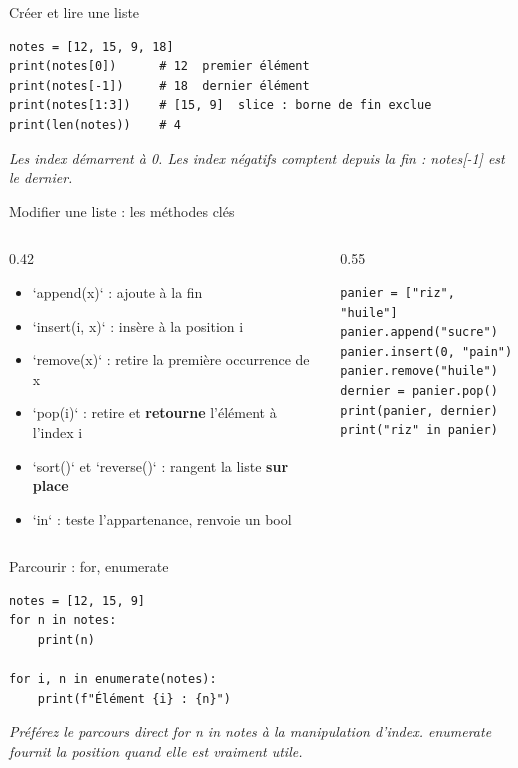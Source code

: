 \documentclass[aspectratio=169,11pt]{beamer}
\begin{document}
\begin{frame}[fragile]{Créer et lire une liste}

\begin{lstlisting}[style=py]
notes = [12, 15, 9, 18]
print(notes[0])      # 12  premier élément
print(notes[-1])     # 18  dernier élément
print(notes[1:3])    # [15, 9]  slice : borne de fin exclue
print(len(notes))    # 4
\end{lstlisting}
\vspace{0.5pt}

{\small\color{PyGris}\itshape Les index démarrent à 0. Les index négatifs comptent depuis la fin : notes[-1] est le dernier.}

\end{frame}

\begin{frame}[fragile]{Modifier une liste : les méthodes clés}
\begin{columns}[t]
\begin{column}{0.42\textwidth}
\begin{itemize}
  \setlength{\itemsep}{1.5pt}\setlength{\parskip}{0pt}
  \item `append(x)` : ajoute à la fin
  \item `insert(i, x)` : insère à la position i
  \item `remove(x)` : retire la première occurrence de x
  \item `pop(i)` : retire et \textbf{retourne} l'élément à l'index i
  \item `sort()` et `reverse()` : rangent la liste \textbf{sur place}
  \item `in` : teste l'appartenance, renvoie un bool
\end{itemize}
\end{column}
\hspace{0.02\textwidth}
\begin{column}{0.55\textwidth}
\begin{lstlisting}[style=pysmall]
panier = ["riz", "huile"]
panier.append("sucre")
panier.insert(0, "pain")
panier.remove("huile")
dernier = panier.pop()
print(panier, dernier)
print("riz" in panier)
\end{lstlisting}
\end{column}
\end{columns}
\end{frame}

\begin{frame}[fragile]{Parcourir : for, enumerate}

\begin{lstlisting}[style=py]
notes = [12, 15, 9]
for n in notes:
    print(n)

for i, n in enumerate(notes):
    print(f"Élément {i} : {n}")
\end{lstlisting}
\vspace{0.5pt}

{\small\color{PyGris}\itshape Préférez le parcours direct for n in notes à la manipulation d'index. enumerate fournit la position quand elle est vraiment utile.}

\end{frame}
\end{document}
